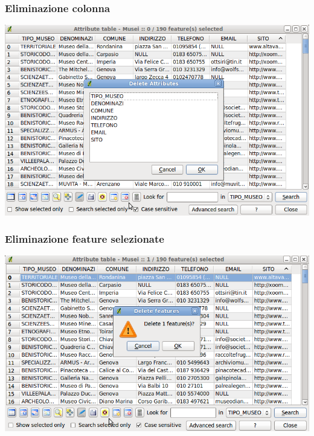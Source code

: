 \documentclass{beamer}
\begin{document}
{ \begin{frame}
   \frametitle{Eliminazione colonna}
		    \begin{center}
			\includegraphics[width=1\textwidth] {topology_attrmanagement_pics/delete_column.png}
		    \end{center}
\end{frame}


 \begin{frame}
   \frametitle{Eliminazione feature selezionate}
		    \begin{center}
			\includegraphics[width=1\textwidth] {topology_attrmanagement_pics/delete_selected_features.png}
		    \end{center}
\end{frame}


}
\end{document}
